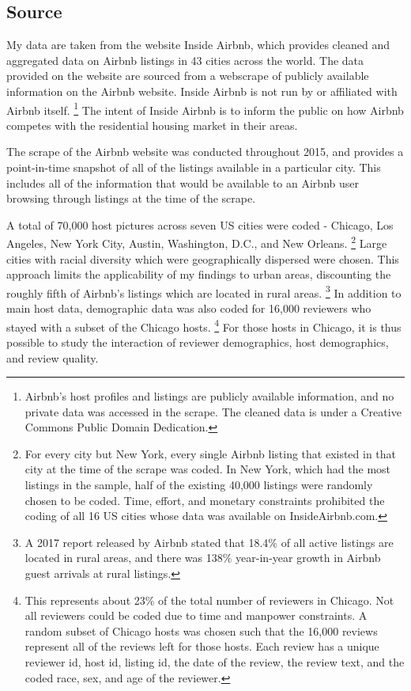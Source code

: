 \subsection{Source} 

My data are taken from the website Inside Airbnb, which provides cleaned and aggregated data on Airbnb listings in 43 cities across the world.\cite{insideairbnb} The data provided on the website are sourced from a webscrape of publicly available information on the Airbnb website. Inside Airbnb is not run by or affiliated with Airbnb itself.%
	\footnote{Airbnb's host profiles and listings are publicly available information, and no private data was accessed in the scrape. The cleaned data is under a Creative Commons Public Domain Dedication.} 
The intent of Inside Airbnb is to inform the public on how Airbnb competes with the residential housing market in their areas. 

The scrape of the Airbnb website was conducted throughout 2015, and provides a point-in-time snapshot of all of the listings available in a particular city. This includes all of the information that would be available to an Airbnb user browsing through listings at the time of the scrape. 

A total of 70,000 host pictures across seven US cities were coded - Chicago, Los Angeles, New York City, Austin, Washington, D.C., and New Orleans.%
	\footnote{For every city but New York, every single Airbnb listing that existed in that city at the time of the scrape was coded. In New York, which had the most listings in the sample, half of the existing 40,000 listings were randomly chosen to be coded. Time, effort, and monetary constraints prohibited the coding of all 16 US cities whose data was available on InsideAirbnb.com.} 
Large cities with racial diversity which were geographically dispersed were chosen. This approach limits the applicability of my findings to urban areas, discounting the roughly fifth of Airbnb's listings which are located in rural areas.%
	\footnote{A 2017 report released by Airbnb stated that 18.4\% of all active listings are located in rural areas, and there was 138\% year-in-year growth in Airbnb guest arrivals at rural listings.} 
In addition to main host data, demographic data was also coded for 16,000 reviewers who stayed with a subset of the Chicago hosts.%
	\footnote{This represents about 23\% of the total number of reviewers in Chicago. Not all reviewers could be coded due to time and manpower constraints. A random subset of Chicago hosts was chosen such that the 16,000 reviews represent all of the reviews left for those hosts. Each review has a unique reviewer id, host id, listing id, the date of the review, the review text, and the coded race, sex, and age of the reviewer.}
For those hosts in Chicago, it is thus possible to study the interaction of reviewer demographics, host demographics, and review quality.


